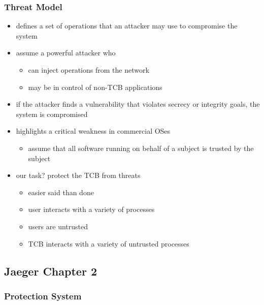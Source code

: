 \documentclass[
  12pt]{findlay}
\providecommand{\tightlist}{%
  \setlength{\itemsep}{0pt}\setlength{\parskip}{0pt}}
\begin{document}
\hypertarget{threat-model}{%
\subsubsection{Threat Model}\label{threat-model}}

\begin{itemize}
\tightlist
\item
  defines a set of operations that an attacker may use to compromise the
  system
\item
  assume a powerful attacker who

  \begin{itemize}
  \tightlist
  \item
    can inject operations from the network
  \item
    may be in control of non-TCB applications
  \end{itemize}
\item
  if the attacker finds a vulnerability that violates secrecy or
  integrity goals, the system is compromised
\item
  highlights a critical weakness in commercial OSes

  \begin{itemize}
  \tightlist
  \item
    assume that all software running on behalf of a subject is trusted
    by the subject
  \end{itemize}
\item
  our task? protect the TCB from threats

  \begin{itemize}
  \tightlist
  \item
    easier said than done
  \item
    user interacts with a variety of processes
  \item
    users are untrusted
  \item
    TCB interacts with a variety of untrusted processes
  \end{itemize}
\end{itemize}

\hypertarget{jaeger-chapter-2}{%
\subsection{Jaeger Chapter 2}\label{jaeger-chapter-2}}

\hypertarget{protection-system}{%
\subsubsection{Protection System}\label{protection-system}}
\end{document}
